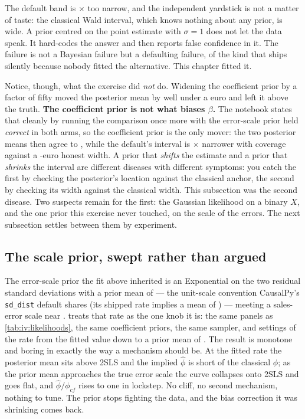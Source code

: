 The default band is \nbElevenPriorNarrowFactor$\times$ too narrow, and the independent yardstick is
not a matter of taste: the classical Wald interval, which knows nothing about any prior, is
\eur{\nbElevenIvWidth} wide. A prior centred on the point estimate with $\sigma = 1$ does not let
the data speak. It hard-codes the answer and then reports false confidence in it. The failure
is not a Bayesian failure but a defaulting failure, of the kind that ships silently because nobody
fitted the alternative. This chapter fitted it.

Notice, though, what the exercise did \emph{not} do. Widening the coefficient prior by a factor of
fifty moved the posterior mean by well under a euro and left it above the truth. \textbf{The
coefficient prior is not what biases $\beta$.} The notebook states that cleanly by running the
comparison once more with the error-scale prior held \emph{correct} in both arms, so the
coefficient prior is the only mover: the two posterior means then agree to
\eur{\nbElevenTightcoefMeanGap}, while the default's interval is
\nbElevenTightcoefWidthRatio$\times$ narrower with \pc{\nbElevenTightcoefCovPct} coverage
against a \nbElevenWeakcoefWidth-euro honest width. A prior that \emph{shifts} the estimate
and a prior that \emph{shrinks} the interval are different diseases with different symptoms:
you catch the first by checking the posterior's location against the classical anchor, the
second by checking its width against the classical width. This subsection was the second
disease. Two suspects remain for the first: the Gaussian likelihood on a binary $X$, and the
one prior this exercise never touched, on the scale of the errors. The next subsection settles
between them by experiment.

\subsection*{The scale prior, swept rather than argued}

The error-scale prior the fit above inherited is an Exponential on the two residual standard
deviations with a prior mean of  --- the unit-scale convention CausalPy's
\texttt{sd\_dist} default shares (its shipped rate implies a mean of ) --- meeting a
sales-error scale near .  treats that rate as the one knob
it is: the same \nbElevenNSeeds{} panels as \cref{tab:iv:likelihoods}, the same coefficient
priors, the same sampler, and \nbElevenScNRates{} settings of the rate from the fitted value
down to a prior mean of . The result is monotone and boring in exactly the way a
mechanism should be. At the fitted rate the posterior mean sits \eur{\nbElevenScaleShipBias}
above 2SLS and the implied $\hat\phi$ is \pc{\nbElevenScaleShipShrinkPct} short of the
classical $\phi$; as the prior mean approaches the true error scale the curve collapses onto
2SLS and goes flat, and $\hat\phi/\phi_{cf}$ rises to one in lockstep. No cliff, no second
mechanism, nothing to tune. The prior stops fighting the data, and the bias correction it was
shrinking comes back.

